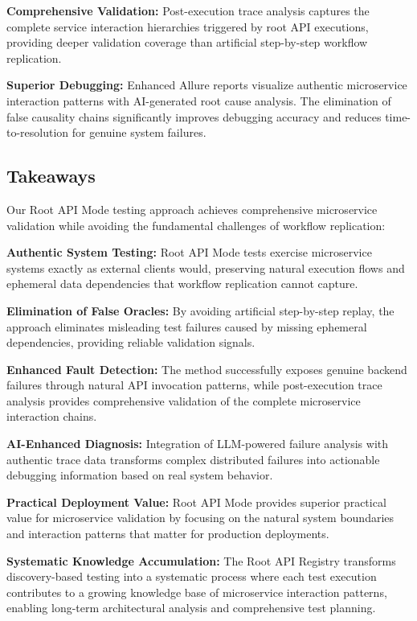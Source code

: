 \documentclass[conference]{IEEEtran}
\begin{document}
\textbf{Comprehensive Validation:} Post-execution trace analysis captures the complete service interaction hierarchies triggered by root API executions, providing deeper validation coverage than artificial step-by-step workflow replication.

\textbf{Superior Debugging:} Enhanced Allure reports visualize authentic microservice interaction patterns with AI-generated root cause analysis. The elimination of false causality chains significantly improves debugging accuracy and reduces time-to-resolution for genuine system failures.

\subsection{Takeaways}
Our Root API Mode testing approach achieves comprehensive microservice validation while avoiding the fundamental challenges of workflow replication:

\textbf{Authentic System Testing:} Root API Mode tests exercise microservice systems exactly as external clients would, preserving natural execution flows and ephemeral data dependencies that workflow replication cannot capture.

\textbf{Elimination of False Oracles:} By avoiding artificial step-by-step replay, the approach eliminates misleading test failures caused by missing ephemeral dependencies, providing reliable validation signals.

\textbf{Enhanced Fault Detection:} The method successfully exposes genuine backend failures through natural API invocation patterns, while post-execution trace analysis provides comprehensive validation of the complete microservice interaction chains.

\textbf{AI-Enhanced Diagnosis:} Integration of LLM-powered failure analysis with authentic trace data transforms complex distributed failures into actionable debugging information based on real system behavior.

\textbf{Practical Deployment Value:} Root API Mode provides superior practical value for microservice validation by focusing on the natural system boundaries and interaction patterns that matter for production deployments.

\textbf{Systematic Knowledge Accumulation:} The Root API Registry transforms discovery-based testing into a systematic process where each test execution contributes to a growing knowledge base of microservice interaction patterns, enabling long-term architectural analysis and comprehensive test planning.





\end{document}
